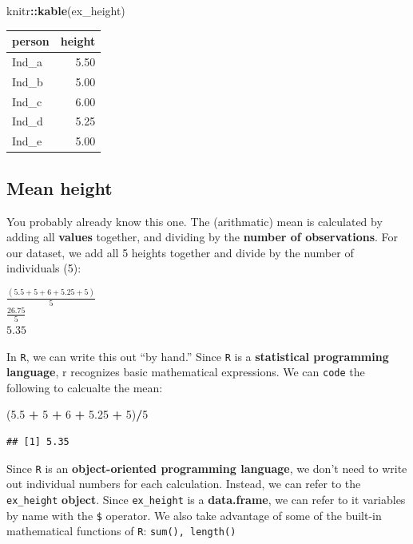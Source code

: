 \documentclass[
]{book}
\newenvironment{Shaded}{\begin{snugshade}}{\end{snugshade}}
\newcommand{\DecValTok}[1]{\textcolor[rgb]{0.00,0.00,0.81}{#1}}
\newcommand{\FloatTok}[1]{\textcolor[rgb]{0.00,0.00,0.81}{#1}}
\newcommand{\FunctionTok}[1]{\textcolor[rgb]{0.13,0.29,0.53}{\textbf{#1}}}
\newcommand{\NormalTok}[1]{#1}
\newcommand{\SpecialCharTok}[1]{\textcolor[rgb]{0.81,0.36,0.00}{\textbf{#1}}}
\begin{document}
\begin{Shaded}
\begin{Highlighting}[]
\NormalTok{knitr}\SpecialCharTok{::}\FunctionTok{kable}\NormalTok{(ex\_height)}
\end{Highlighting}
\end{Shaded}

\begin{tabular}{l|r}
\hline
person & height\\
\hline
Ind\_a & 5.50\\
\hline
Ind\_b & 5.00\\
\hline
Ind\_c & 6.00\\
\hline
Ind\_d & 5.25\\
\hline
Ind\_e & 5.00\\
\hline
\end{tabular}

\hypertarget{mean-height}{%
\subsection{Mean height}\label{mean-height}}

You probably already know this one. The (arithmatic) mean is calculated by adding all \textbf{values} together, and dividing by the \textbf{number of observations}. For our dataset, we add all 5 heights together and divide by the number of individuals (5):

\(\frac{(5.5 + 5 + 6 + 5.25 + 5)}{5}\)\\
\(\frac{26.75}{5}\)\\
\(5.35\)

In \texttt{R}, we can write this out ``by hand.'' Since \texttt{R} is a \textbf{statistical programming language}, r recognizes basic mathematical expressions. We can \texttt{code} the following to calcualte the mean:

\begin{Shaded}
\begin{Highlighting}[]
\NormalTok{(}\FloatTok{5.5} \SpecialCharTok{+} \DecValTok{5} \SpecialCharTok{+} \DecValTok{6} \SpecialCharTok{+} \FloatTok{5.25} \SpecialCharTok{+} \DecValTok{5}\NormalTok{)}\SpecialCharTok{/}\DecValTok{5}
\end{Highlighting}
\end{Shaded}

\begin{verbatim}
## [1] 5.35
\end{verbatim}

Since \texttt{R} is an \textbf{object-oriented programming language}, we don't need to write out individual numbers for each calculation. Instead, we can refer to the \texttt{ex\_height} \textbf{object}. Since \texttt{ex\_height} is a \textbf{data.frame}, we can refer to it variables by name with the \texttt{\$} operator. We also take advantage of some of the built-in mathematical functions of \texttt{R}: \texttt{sum(),\ length()}
\end{document}
